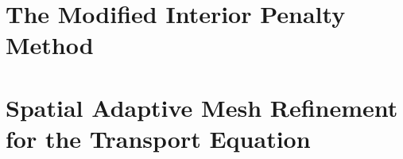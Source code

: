 \documentclass[preprint,review,10pt]{elsarticle}
\begin{document}



\appendix
\section{The Modified Interior Penalty Method} \label{app::MIP}

\section{Spatial Adaptive Mesh Refinement for the Transport Equation} \label{app::AMR}
\end{document}
